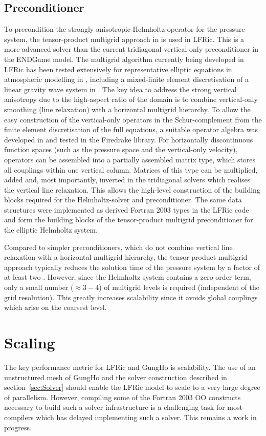 \documentclass[review,times]{elsarticle}
\begin{document}
\subsection{\label{sec:preconditioner}Preconditioner}
To precondition the strongly anisotropic Helmholtz-operator for the
pressure system, the tensor-product multigrid approach in
\cite{Borm2001} is used in LFRic. This is a more advanced solver than
the current tridiagonal vertical-only preconditioner in the ENDGame
model. The multigrid algorithm currently being developed in LFRic has been tested
extensively for representative elliptic equations in atmospheric
modelling in \cite{Mueller2014,Dedner2016}, including a mixed-finite
element discretisation of a linear gravity wave system in
\cite{Mitchell2016}. The key idea to address the strong vertical
anisotropy due to the high-aspect ratio of the domain is to combine
vertical-only smoothing (line relaxation) with a horizontal multigrid
hierarchy. To allow the easy construction of the vertical-only
operators in the Schur-complement from the finite element
discretisation of the full equations, a suitable operator algebra was
developed in \cite{Mitchell2016} and tested in the Firedrake
library. For horizontally discontinuous function spaces (such as the
pressure space and the vertical-only velocity), operators can be
assembled into a partially assembled matrix type, which stores all
couplings within one vertical column. Matrices of this type can be
multiplied, added and, most importantly, inverted in the tridiagonal
solvers which realises the vertical line relaxation. This allows the
high-level construction of the building blocks required for the
Helmholtz-solver and preconditioner. The same data structures were
implemented as derived Fortran 2003 types in the LFRic code and form
the building blocks of the tensor-product multigrid preconditioner for
the elliptic Helmholtz system.

Compared to simpler preconditioners, which do not combine vertical
line relaxation with a horizontal multigrid hierarchy, the
tensor-product multigrid approach typically reduces the solution time
of the pressure system by a factor of at least two
\cite{Mueller2014,Mitchell2016}. However, since the Helmholtz system
contains a zero-order term, only a small number ($\approx 3-4$) of
multigrid levels is required (independent of the grid
resolution). This greatly increases scalability since it avoids global
couplings which arise on the coarsest level.

\section{\label{sec:scal}Scaling}
The key performance metric for
LFRic and GungHo is scalability. The use of an unstructured mesh of
GungHo and the solver construction described in
section~\ref{sec:Solver} should enable the LFRic model to scale to a
very large degree of parallelism. However, compiling some of the
Fortran 2003 OO constructs necessary to build such a solver
infrastructure is a challenging task for most compilers which has
delayed implementing such a solver. This remains a work in progress.
\end{document}
